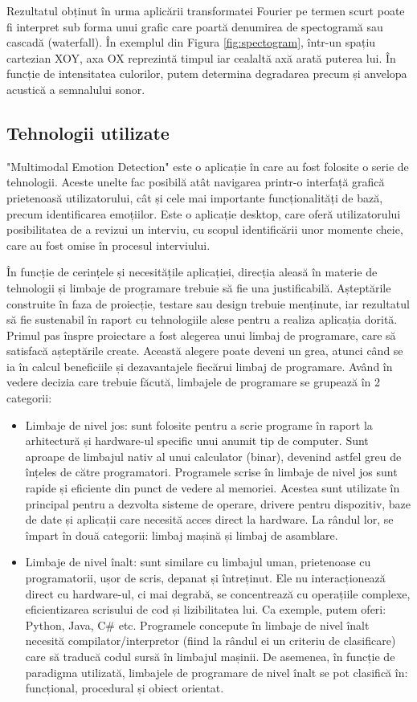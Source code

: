 \documentclass[a4paper, 12pt]{report}
\begin{document}
	Rezultatul obținut în urma aplicării transformatei Fourier pe termen scurt poate fi interpret sub forma unui grafic care poartă denumirea de spectogramă sau cascadă (waterfall). În exemplul din Figura \ref{fig:spectogram}, într-un spațiu cartezian XOY, axa OX reprezintă timpul iar cealaltă axă arată puterea lui. În funcție de intensitatea culorilor, putem determina degradarea precum și anvelopa acustică a semnalului sonor.
	
	\clearpage
	\subsection{Tehnologii utilizate}
	"Multimodal Emotion Detection" este o aplicație în care au fost folosite o serie de tehnologii. Aceste unelte fac posibilă atât navigarea printr-o interfață grafică prietenoasă utilizatorului, cât și cele mai importante funcționalități de bază, precum identificarea emoțiilor. Este o aplicație desktop, care oferă utilizatorului posibilitatea de a revizui un interviu, cu scopul identificării unor momente cheie, care au fost omise în procesul interviului.
	
	În funcție de cerințele și necesitățile aplicației, direcția aleasă în materie de tehnologii și limbaje de programare trebuie să fie una justificabilă. Așteptările construite în faza de proiecție, testare sau design trebuie menținute, iar rezultatul să fie sustenabil în raport cu tehnologiile alese pentru a realiza aplicația dorită. Primul pas înspre proiectare a fost alegerea unui limbaj de programare, care să satisfacă așteptările create. Această alegere poate deveni un grea, atunci când se ia în calcul beneficiile și dezavantajele fiecărui limbaj de programare. Având în vedere decizia care trebuie făcută, limbajele de programare se grupează în 2 categorii:
	\begin{itemize}
		\item Limbaje de nivel jos: sunt folosite pentru a scrie programe în raport la arhitectură și hardware-ul specific unui anumit tip de computer. Sunt aproape de limbajul nativ al unui calculator (binar), devenind astfel greu de înțeles de către programatori.
		Programele scrise în limbaje de nivel jos sunt rapide și eficiente din punct de vedere al memoriei. Acestea sunt utilizate în principal pentru a dezvolta sisteme de operare, drivere pentru dispozitiv, baze de date și aplicații care necesită acces direct la hardware. La rândul lor, se împart în două categorii: limbaj mașină și limbaj de asamblare.
		\item Limbaje de nivel înalt: sunt similare cu limbajul uman, prietenoase cu programatorii, ușor de scris, depanat și întreținut. Ele nu interacționează direct cu hardware-ul, ci mai degrabă, se concentrează cu operațiile complexe, eficientizarea scrisului de cod și lizibilitatea lui. Ca exemple, putem oferi: Python, Java, C\# etc. Programele concepute în limbaje de nivel înalt necesită compilator/interpretor (fiind la rândul ei un criteriu de clasificare) care să traducă codul sursă în limbajul mașinii. De asemenea, în funcție de paradigma utilizată, limbajele de programare de nivel înalt se pot clasifică în: funcțional, procedural și obiect orientat.
	\end{itemize}
	
\end{document}

